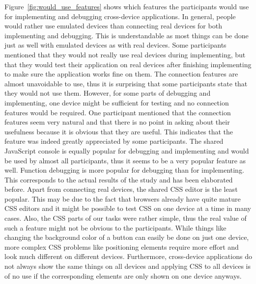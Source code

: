Figure~\ref{fig:would_use_features} shows which features the participants would use for implementing and debugging cross-device applications. In general, people would rather use emulated devices than connecting real devices for both implementing and debugging. This is understandable as most things can be done just as well with emulated devices as with real devices. Some participants mentioned that they would not really use real devices during implementing, but that they would test their application on real devices after finishing implementing to make sure the application works fine on them. The connection features are almost unavoidable to use, thus it is surprising that some participants state that they would not use them. However, for some parts of debugging and implementing, one device might be sufficient for testing and no connection features would be required. One participant mentioned that the connection features seem very natural and that there is no point in asking about their usefulness because it is obvious that they are useful. This indicates that the feature was indeed greatly appreciated by some participants. The shared JavaScript console is equally popular for debugging and implementing and would be used by almost all participants, thus it seems to be a very popular feature as well. Function debugging is more popular for debugging than for implementing. This corresponds to the actual results of the study and has been elaborated before. Apart from connecting real devices, the shared CSS editor is the least popular. This may be due to the fact that browsers already have quite mature CSS editors and it might be possible to test CSS on one device at a time in many cases. Also, the CSS parts of our tasks were rather simple, thus the real value of such a feature might not be obvious to the participants. While things like changing the background color of a button can easily be done on just one device, more complex CSS problems like positioning elements require more effort and look much different on different devices. Furthermore, cross-device applications do not always show the same things on all devices and applying CSS to all devices is of no use if the corresponding elements are only shown on one device anyways.


